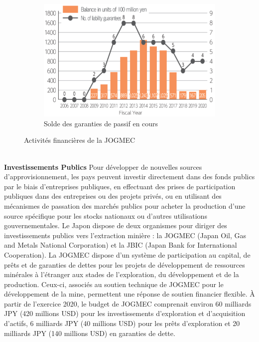 \begin{figure}[!b]
\begin{subfigure}[b]{0.31\textwidth}
         \includegraphics[width=\textwidth]{Images/Metals_policies/JOGMEC3.png}
         \caption{Solde des garanties de passif en cours}
         \label{fig:JOGMEC3}
    \end{subfigure}
    \caption{Activités financières de la JOGMEC}
    \label{fig:metal_histoire}
\end{figure}
~\\
\textbf{Investissements Publics}\smallbreak
Pour développer de nouvelles sources d'approvisionnement, les pays peuvent investir directement dans des fonds publics par le biais d'entreprises publiques, en effectuant des prises de participation publiques dans des entreprises ou des projets privés, ou en utilisant des mécanismes de passation des marchés publics pour acheter la production d'une source spécifique pour les stocks nationaux ou d'autres utilisations gouvernementales.\smallbreak
Le Japon dispose de deux organismes pour diriger des investissements publics vers l'extraction minière : la JOGMEC (Japan Oil, Gas and Metals National Corporation) et la JBIC (Japan Bank for International Cooperation).\smallbreak
La JOGMEC dispose d'un système de participation au capital, de prêts et de garanties de dettes pour les projets de développement de ressources minérales à l'étranger aux stades de l'exploration, du développement et de la production. Ceux-ci, associés au soutien technique de JOGMEC pour le développement de la mine, permettent une réponse de soutien financier flexible. À partir de l'exercice 2020, le budget de JOGMEC comprenait environ 60 milliards JPY (420 millions USD) pour les investissements d'exploration et d'acquisition d'actifs, 6 milliards JPY (40 millions USD) pour les prêts d'exploration et 20 milliards JPY (140 millions USD) en garanties de dette.\smallbreak
